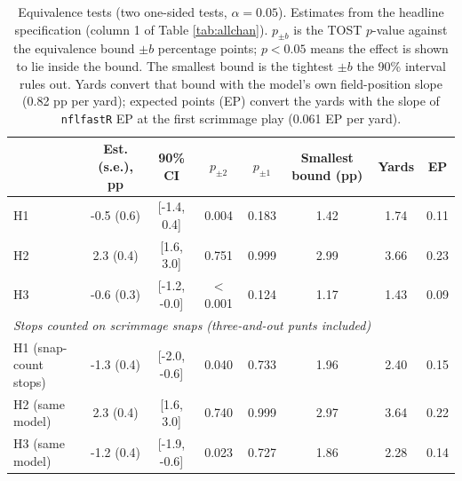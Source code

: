 \begin{table}[htbp]
\centering
\caption{\label{tab:tost} Equivalence tests (two one-sided tests, $\alpha=0.05$). Estimates from the headline specification (column 1 of Table \ref{tab:allchan}). $p_{\pm b}$ is the TOST $p$-value against the equivalence bound $\pm b$ percentage points; $p<0.05$ means the effect is shown to lie inside the bound. The smallest bound is the tightest $\pm b$ the 90\% interval rules out. Yards convert that bound with the model's own field-position slope (0.82 pp per yard); expected points (EP) convert the yards with the slope of \texttt{nflfastR} EP at the first scrimmage play (0.061 EP per yard).}
\begin{tabular}{lccccccc}
\toprule
 & Est. (s.e.), pp & 90\% CI & $p_{\pm 2}$ & $p_{\pm 1}$ & Smallest bound (pp) & Yards & EP \\
\midrule
H1 & -0.5 (0.6) & [-1.4, 0.4] & 0.004 & 0.183 & 1.42 & 1.74 & 0.11 \\
H2 & 2.3 (0.4) & [1.6, 3.0] & 0.751 & 0.999 & 2.99 & 3.66 & 0.23 \\
H3 & -0.6 (0.3) & [-1.2, -0.0] & $<$0.001 & 0.124 & 1.17 & 1.43 & 0.09 \\
\midrule
\multicolumn{8}{l}{\emph{Stops counted on scrimmage snaps (three-and-out punts included)}} \\
H1 (snap-count stops) & -1.3 (0.4) & [-2.0, -0.6] & 0.040 & 0.733 & 1.96 & 2.40 & 0.15 \\
H2 (same model) & 2.3 (0.4) & [1.6, 3.0] & 0.740 & 0.999 & 2.97 & 3.64 & 0.22 \\
H3 (same model) & -1.2 (0.4) & [-1.9, -0.6] & 0.023 & 0.727 & 1.86 & 2.28 & 0.14 \\
\bottomrule
\end{tabular}
\end{table}
